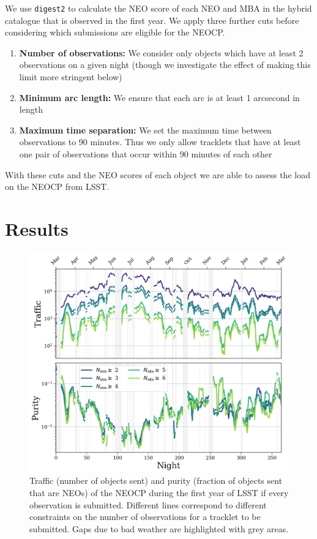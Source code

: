 \documentclass[twocolumn, twocolappendix]{aastex631}
\newcommand{\dig}{\texttt{digest2}}
\begin{document}
We use \dig{} to calculate the NEO score of each NEO and MBA in the hybrid catalogue that is observed in the first year. We apply three further cuts before considering which submissions are eligible for the NEOCP.
\begin{enumerate}
    \item \textbf{Number of observations:} We consider only objects which have at least 2 observations on a given night (though we investigate the effect of making this limit more stringent below)
    \item \textbf{Minimum arc length:} We ensure that each arc is at least 1 arcsecond in length
    \item \textbf{Maximum time separation:} We set the maximum time between observations to 90 minutes. Thus we only allow tracklets that have at least one pair of observations that occur within 90 minutes of each other
\end{enumerate}
With these cuts and the NEO scores of each object we are able to assess the load on the NEOCP from LSST.

\section{Results} \label{sec:results}
\begin{figure}
    \centering
    \includegraphics[width=\textwidth]{scary.png}
    \caption{Traffic (number of objects sent) and purity (fraction of objects sent that are NEOs) of the NEOCP during the first year of LSST if every observation is submitted. Different lines correspond to different constraints on the number of observations for a tracklet to be submitted. Gaps due to bad weather are highlighted with grey areas.}
\end{figure}
\end{document}
